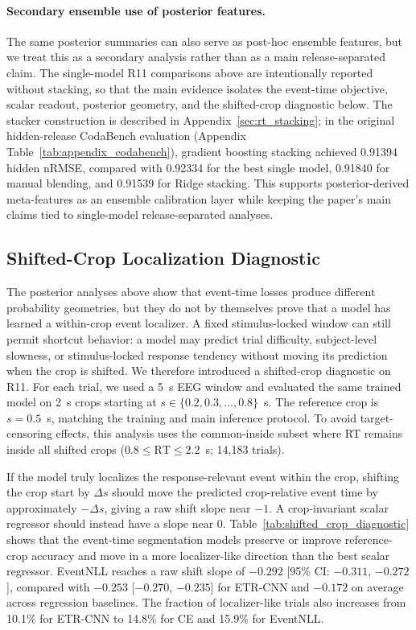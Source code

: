 \documentclass[12pt]{article}
\begin{document}
\paragraph{Secondary ensemble use of posterior features.}
The same posterior summaries can also serve as post-hoc ensemble features, but we treat this as a secondary analysis rather than as a main release-separated claim. The single-model R11 comparisons above are intentionally reported without stacking, so that the main evidence isolates the event-time objective, scalar readout, posterior geometry, and the shifted-crop diagnostic below. The stacker construction is described in Appendix~\ref{sec:rt_stacking}; in the original hidden-release CodaBench evaluation (Appendix Table~\ref{tab:appendix_codabench}), gradient boosting stacking achieved 0.91394 hidden nRMSE, compared with 0.92334 for the best single model, 0.91840 for manual blending, and 0.91539 for Ridge stacking. This supports posterior-derived meta-features as an ensemble calibration layer while keeping the paper's main claims tied to single-model release-separated analyses.

\subsection{Shifted-Crop Localization Diagnostic}

The posterior analyses above show that event-time losses produce different probability geometries, but they do not by themselves prove that a model has learned a within-crop event localizer. A fixed stimulus-locked window can still permit shortcut behavior: a model may predict trial difficulty, subject-level slowness, or stimulus-locked response tendency without moving its prediction when the crop is shifted. We therefore introduced a shifted-crop diagnostic on R11. For each trial, we used a 5~s EEG window and evaluated the same trained model on 2~s crops starting at $s\in\{0.2,0.3,\dots,0.8\}$~s. The reference crop is $s=0.5$~s, matching the training and main inference protocol. To avoid target-censoring effects, this analysis uses the common-inside subset where RT remains inside all shifted crops ($0.8\leq \mathrm{RT}\leq 2.2$~s; 14{,}183 trials).

If the model truly localizes the response-relevant event within the crop, shifting the crop start by $\Delta s$ should move the predicted crop-relative event time by approximately $-\Delta s$, giving a raw shift slope near $-1$. A crop-invariant scalar regressor should instead have a slope near 0. Table~\ref{tab:shifted_crop_diagnostic} shows that the event-time segmentation models preserve or improve reference-crop accuracy and move in a more localizer-like direction than the best scalar regressor. EventNLL reaches a raw shift slope of $-0.292$ [95\% CI: $-0.311$, $-0.272$], compared with $-0.253$ [$-0.270$, $-0.235$] for ETR-CNN and $-0.172$ on average across regression baselines. The fraction of localizer-like trials also increases from 10.1\% for ETR-CNN to 14.8\% for CE and 15.9\% for EventNLL.
\end{document}
